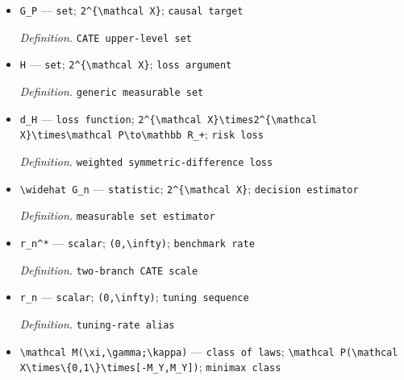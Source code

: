 \documentclass{article}
\begin{document}
\begin{itemize}
  \par\smallskip\noindent\emph{Definition.} \texttt{near-\allowbreak{}threshold band}
  \item \texttt{G\_\allowbreak{}P} --- \texttt{set}; \texttt{2\textasciicircum{}\{\textbackslash{}\allowbreak{}mathcal X\}\allowbreak{}}; \texttt{causal target}
  \par\smallskip\noindent\emph{Definition.} \texttt{CATE upper-\allowbreak{}level set}
  \item \texttt{H} --- \texttt{set}; \texttt{2\textasciicircum{}\{\textbackslash{}\allowbreak{}mathcal X\}\allowbreak{}}; \texttt{loss argument}
  \par\smallskip\noindent\emph{Definition.} \texttt{generic measurable set}
  \item \texttt{d\_\allowbreak{}H} --- \texttt{loss function}; \texttt{2\textasciicircum{}\{\textbackslash{}\allowbreak{}mathcal X\}\allowbreak{}\textbackslash{}\allowbreak{}times2\textasciicircum{}\{\textbackslash{}\allowbreak{}mathcal X\}\allowbreak{}\textbackslash{}\allowbreak{}times\textbackslash{}\allowbreak{}mathcal P\textbackslash{}\allowbreak{}to\textbackslash{}\allowbreak{}mathbb R\_\allowbreak{}+\allowbreak{}}; \texttt{risk loss}
  \par\smallskip\noindent\emph{Definition.} \texttt{weighted symmetric-\allowbreak{}difference loss}
  \item \texttt{\textbackslash{}\allowbreak{}widehat G\_\allowbreak{}n} --- \texttt{statistic}; \texttt{2\textasciicircum{}\{\textbackslash{}\allowbreak{}mathcal X\}\allowbreak{}}; \texttt{decision estimator}
  \par\smallskip\noindent\emph{Definition.} \texttt{measurable set estimator}
  \item \texttt{r\_\allowbreak{}n\textasciicircum{}*} --- \texttt{scalar}; \texttt{(0,\allowbreak{}\textbackslash{}\allowbreak{}infty)}; \texttt{benchmark rate}
  \par\smallskip\noindent\emph{Definition.} \texttt{two-\allowbreak{}branch CATE scale}
  \item \texttt{r\_\allowbreak{}n} --- \texttt{scalar}; \texttt{(0,\allowbreak{}\textbackslash{}\allowbreak{}infty)}; \texttt{tuning sequence}
  \par\smallskip\noindent\emph{Definition.} \texttt{tuning-\allowbreak{}rate alias}
  \item \texttt{\textbackslash{}\allowbreak{}mathcal M(\textbackslash{}\allowbreak{}xi,\allowbreak{}\textbackslash{}\allowbreak{}gamma;\allowbreak{}\textbackslash{}\allowbreak{}kappa)} --- \texttt{class of laws}; \texttt{\textbackslash{}\allowbreak{}mathcal P(\textbackslash{}\allowbreak{}mathcal X\textbackslash{}\allowbreak{}times\textbackslash{}\allowbreak{}\{0,\allowbreak{}1\textbackslash{}\allowbreak{}\}\allowbreak{}\textbackslash{}\allowbreak{}times[-\allowbreak{}M\_\allowbreak{}Y,\allowbreak{}M\_\allowbreak{}Y])}; \texttt{minimax class}

\end{itemize}
\end{document}
